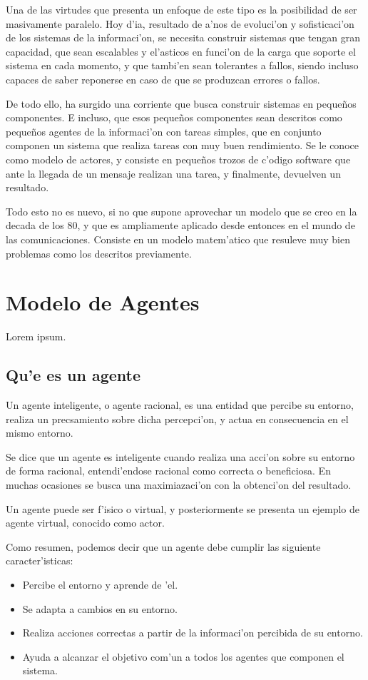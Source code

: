 \documentclass[12pt]{article}
\begin{document}
Una de las virtudes que presenta un enfoque de este tipo es la posibilidad de ser masivamente
paralelo. Hoy d'ia, resultado de a'nos de evoluci'on y sofisticaci'on de los sistemas de la informaci'on,
se necesita construir sistemas que tengan gran capacidad, que sean escalables y el'asticos
en funci'on de la carga que soporte el sistema en cada momento, y que tambi'en sean tolerantes
a fallos, siendo incluso capaces de saber reponerse en caso de que se produzcan errores o fallos.

De todo ello, ha surgido una corriente que busca construir sistemas en pequeños componentes. E incluso,
que esos pequeños componentes sean descritos como pequeños agentes de la informaci'on con tareas simples,
que en conjunto componen un sistema que realiza tareas con muy buen rendimiento. Se le conoce como modelo de
actores, y consiste en pequeños trozos de c'odigo software que ante la llegada de un mensaje realizan
una tarea, y finalmente, devuelven un resultado.

Todo esto no es nuevo, si no que supone aprovechar un modelo que se creo en la decada de los 80, y
que es ampliamente aplicado desde entonces en el mundo de las comunicaciones. Consiste en un
modelo matem'atico que resuleve muy bien problemas como los descritos previamente.

\section{Modelo de Agentes}
\label{sec:modelo de agentes}
Lorem ipsum.
\subsection{Qu'e es un agente}
\label{sub:que es un agente}
Un agente inteligente, o agente racional, es una entidad que percibe su entorno, realiza
un precsamiento sobre dicha percepci'on, y actua en consecuencia en el mismo entorno.

Se dice que un agente es inteligente cuando realiza una acci'on sobre su entorno de forma racional,
entendi'endose racional como correcta o beneficiosa. En muchas ocasiones se busca una
maximiazaci'on con la obtenci'on del resultado.

Un agente puede ser f'isico o virtual, y posteriormente se presenta un ejemplo de agente virtual,
conocido como actor.

Como resumen, podemos decir que un agente debe cumplir las siguiente caracter'isticas:

\begin{itemize}
	\item Percibe el entorno y aprende de 'el.
	\item Se adapta a cambios en su entorno.
	\item Realiza acciones correctas a partir de la informaci'on percibida de su entorno.
	\item Ayuda a alcanzar el objetivo com'un a todos los agentes que componen el sistema.
\end{itemize}
\end{document}
